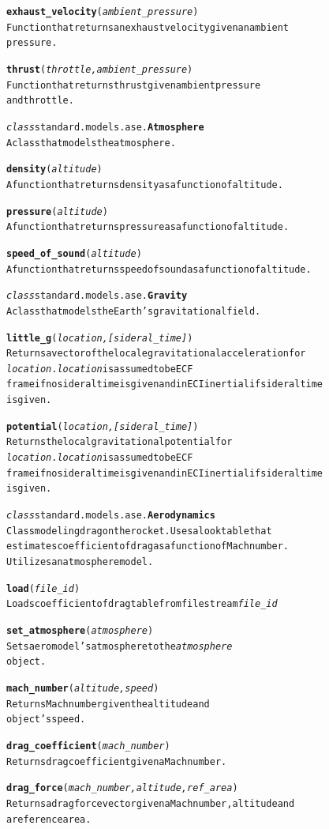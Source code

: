 \documentclass{book}
\begin{document}
\begin{alltt}
  \textbf{exhaust_velocity}(\emph{ambient_pressure})
    Function that returns an exhaust velocity given an ambient
    pressure.

  \textbf{thrust}(\emph{throttle, ambient_pressure})
    Function that returns thrust given ambient pressure
    and throttle.

\emph{class} standard.models.ase.\textbf{Atmosphere}
  A class that models the atmosphere.

  \textbf{density}(\emph{altitude} )
    A function that returns density as a function of altitude.

  \textbf{pressure}(\emph{altitude} )
    A function that returns pressure as a function of altitude.

  \textbf{speed_of_sound}(\emph{altitude} )
    A function that returns speed of sound as a function of altitude.

\emph{class} standard.models.ase.\textbf{Gravity}
  A class that models the Earth's gravitational field.

  \textbf{little_g}(\emph{location, [sideral_time] } )
    Returns a vector of the locale gravitational acceleration for
    \emph{location}. \emph{location} is assumed to be ECF
    frame if no sideral time is given and in ECI inertial if sideral time
    is given.

  \textbf{potential}(\emph{location, [sideral_time] } )
    Returns the local gravitational potential for
    \emph{location}. \emph{location} is assumed to be ECF
    frame if no sideral time is given and in ECI inertial if sideral time
    is given.

\emph{class} standard.models.ase.\textbf{Aerodynamics}
  Class modeling drag on the rocket. Uses a look table that
  estimates coefficient of drag as a function of Mach number.
  Utilizes an atmosphere model.

  \textbf{load}(\emph{file_id})
    Loads coefficient of drag table from file stream \emph{file_id}

  \textbf{set_atmosphere}(\emph{atmosphere})
    Sets aero model's atmosphere to the \emph{atmosphere}
    object.

  \textbf{mach_number}(\emph{ altitude, speed})
    Returns Mach number given the altitude and
    object's speed.

  \textbf{drag_coefficient}(\emph{mach_number})
    Returns drag coefficient given a Mach number.

  \textbf{drag_force}(\emph{mach_number, altitude, ref_area})
    Returns a drag force vector given a Mach number, altitude and
    a reference area.


\end{alltt}
\end{document}
